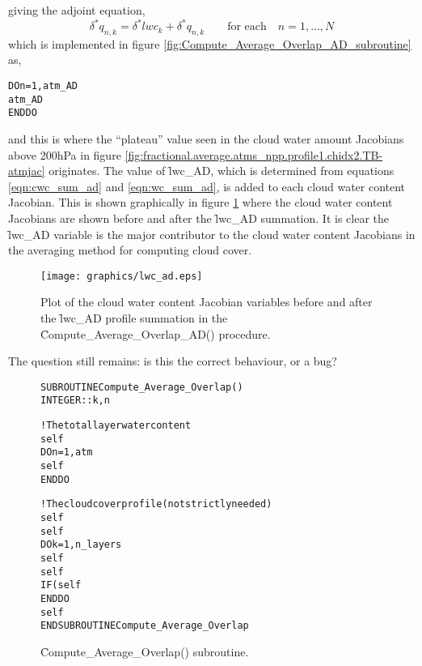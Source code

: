 giving the adjoint equation,
\begin{equation}
  \delta^* q_{n,k} = \delta^* lwc_k + \delta^* q_{n,k}\qquad\mbox{for each}\quad n = 1,\ldots,N
  \label{eqn:lwc_sum_ad}
\end{equation}
which is implemented in figure \ref{fig:Compute_Average_Overlap_AD_subroutine} as,
\begin{alltt}
DO n = 1, atm_AD%n_Clouds
  atm_AD%Cloud(n)%Water_Content(1:n_layers) = atm_AD%Cloud(n)%Water_Content(1:n_layers) + lwc_AD
END DO
\end{alltt}
and this is where the ``plateau'' value seen in the cloud water amount Jacobians above 200hPa in figure \ref{fig:fractional.average.atms_npp.profile1.chidx2.TB-atmjac} originates. The value of \f{lwc\_AD}, which is determined from equations \ref{eqn:cwc_sum_ad} and \ref{eqn:wc_sum_ad}, is added to each cloud water content Jacobian. This is shown graphically in figure \ref{fig:lwc_q_ad} where the cloud water content Jacobians are shown before and after the \f{lwc\_AD} summation. It is clear the \f{lwc\_AD} variable is the major contributor to the cloud water content Jacobians in the averaging method for computing cloud cover.

\begin{figure}[H]
  \caption{Plot of the cloud water content Jacobian variables before and after the \f{lwc\_AD} profile summation in the \f{Compute\_Average\_Overlap\_AD()} procedure.}
  \label{fig:lwc_q_ad}
  \centering
  \texttt{[image: graphics/lwc\_ad.eps]}
\end{figure}

The question still remains: is this the correct behaviour, or a bug?

\begin{figure}[H]
  \caption{\f{Compute\_Average\_Overlap()} subroutine.}
  \label{fig:Compute_Average_Overlap_subroutine}
  \lineacrosspage
  \centering
    \begin{alltt}
SUBROUTINE Compute_Average_Overlap()
  INTEGER  :: k, n

  ! The total layer water content
  self%iVar%lwc = ZERO
  DO n = 1, atm%n_Clouds
    self%iVar%lwc = self%iVar%lwc + atm%Cloud(n)%Water_Content(1:n_layers)
  END DO

  ! The cloud cover profile (not strictly needed)
  self%iVar%wc_sum(0)  = ZERO
  self%iVar%cwc_sum(0) = ZERO
  DO k = 1, n_layers
    self%iVar%wc_sum(k)  = self%iVar%wc_sum(k-1)  + self%iVar%lwc(k)
    self%iVar%cwc_sum(k) = self%iVar%cwc_sum(k-1) + (self%Cloud_Fraction(k) * self%iVar%lwc(k))
    IF ( self%iVar%wc_sum(k) > ZERO ) self%Cloud_Cover(k) = self%iVar%cwc_sum(k)/self%iVar%wc_sum(k)
  END DO
  self%Total_Cloud_Cover = self%Cloud_Cover(n_layers)
END SUBROUTINE Compute_Average_Overlap\end{alltt}
  \lineacrosspage
\end{figure}

